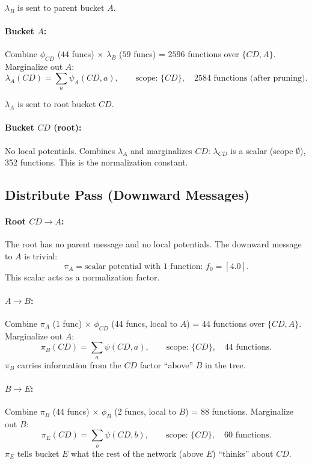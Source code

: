 \documentclass[11pt]{article}
\begin{document}
$\lambda_B$ is sent to parent bucket $A$.

\paragraph{Bucket $A$:}
Combine $\phi_{CD}$ ($44$ funcs) $\times$ $\lambda_B$ ($59$ funcs) = $2596$ functions
over $\{CD, A\}$. Marginalize out $A$:
\[
  \lambda_A(CD) = \sum_a \psi_A(CD, a), \qquad \text{scope: } \{CD\}, \quad
  2584 \text{ functions (after pruning).}
\]

$\lambda_A$ is sent to root bucket $CD$.

\paragraph{Bucket $CD$ (root):}
No local potentials. Combines $\lambda_A$ and marginalizes $CD$: $\lambda_{CD}$
is a scalar (scope $\emptyset$), 352 functions. This is the normalization constant.

\subsection{Distribute Pass (Downward Messages)}

\paragraph{Root $CD \to A$:}
The root has no parent message and no local potentials. The downward message to $A$
is trivial:
\[
  \pi_A = \text{scalar potential with 1 function: } f_0 = [4.0].
\]
This scalar acts as a normalization factor.

\paragraph{$A \to B$:}
Combine $\pi_A$ (1 func) $\times$ $\phi_{CD}$ (44 funcs, local to $A$) =
44 functions over $\{CD, A\}$. Marginalize out $A$:
\[
  \pi_B(CD) = \sum_a \psi(CD, a), \qquad \text{scope: } \{CD\}, \quad 44 \text{ functions.}
\]
$\pi_B$ carries information from the $CD$ factor ``above'' $B$ in the tree.

\paragraph{$B \to E$:}
Combine $\pi_B$ (44 funcs) $\times$ $\phi_B$ (2 funcs, local to $B$) =
88 functions. Marginalize out $B$:
\[
  \pi_E(CD) = \sum_b \psi(CD, b), \qquad \text{scope: } \{CD\}, \quad 60 \text{ functions.}
\]
$\pi_E$ tells bucket $E$ what the rest of the network (above $E$) ``thinks'' about $CD$.
\end{document}
